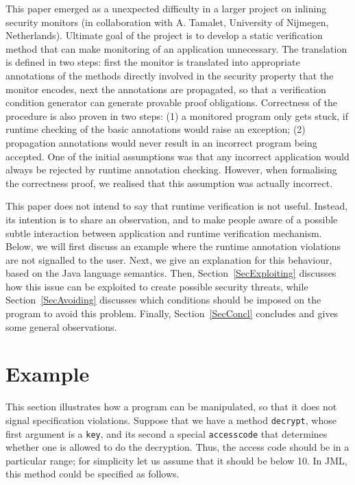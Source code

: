\documentclass[]{llncs}
\def \unsc      {\symbol{95}}
\begin{document}
This paper emerged as a unexpected difficulty in a larger project on
inlining security monitors (in collaboration with A. Tamalet,
University of Nijmegen, Netherlands). Ultimate goal of the project is
to develop a static verification method that can make monitoring of an
application unnecessary. The translation is defined in two steps:
first the monitor is translated into appropriate annotations of the
methods directly involved in the security property that the monitor
encodes, next the annotations are propagated, so that a verification
condition generator can generate provable proof
obligations. Correctness of the procedure is also proven in two steps:
(1) a monitored program only gets stuck, if runtime checking of the
basic annotations would raise an exception; (2) propagation
annotations would never result in an incorrect program being
accepted. One of the initial assumptions was that any incorrect
application would always be rejected by runtime annotation
checking. However, when formalising the correctness proof, we realised
that this assumption was actually incorrect.

This paper does not intend to say that runtime verification is not
useful. Instead, its intention is to share an observation, and to make
people aware of a possible subtle interaction between application and
runtime verification mechanism. Below, we will first discuss an
example where the runtime annotation violations are not signalled to
the user. Next, we give an explanation for this behaviour, based on
the Java language semantics. Then, Section~\ref{SecExploiting}
discusses how this issue can be exploited to create possible security
threats, while Section~\ref{SecAvoiding} discusses which conditions
should be imposed on the program to avoid this problem. Finally,
Section~\ref{SecConcl} concludes and gives some general observations.

\section{Example}\label{SecExample}

This section illustrates how a program can be manipulated, so that it
does not signal specification violations. Suppose that we have a
method \texttt{decrypt}, whose first argument is a \texttt{key}, and
its second a special \texttt{access\unsc code} that determines
whether one is allowed to do the decryption. Thus, the access code
should be in a particular range; for simplicity let us assume that it
should be below 10. In JML, this method could be specified as follows.
\end{document}
